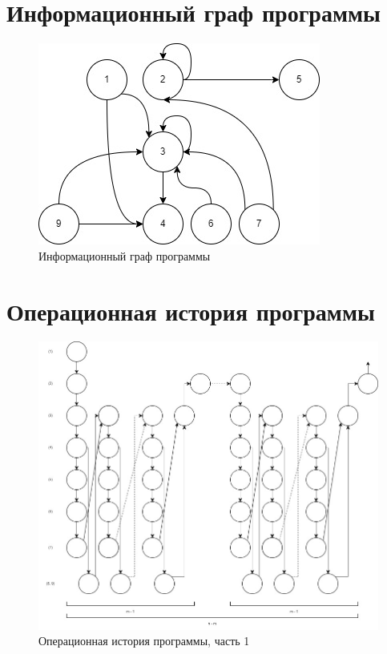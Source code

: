 \documentclass[12pt]{report}
\begin{document}
\section{Информационный граф программы}

\begin{figure}[hp!]
	\centering
	\includegraphics[scale=1]{report_files/information_graph.jpg}
	\caption{Информационный граф программы}
	\label{fig:mpr}
\end{figure}
\newpage

\section{Операционная история программы}

\begin{figure}[hp!]
	\centering
	\includegraphics[scale=0.6]{report_files/operation_history.jpg}
	\caption{Операционная история программы, часть 1}
	\label{fig:mpr}
\end{figure}
\newpage
\end{document}
